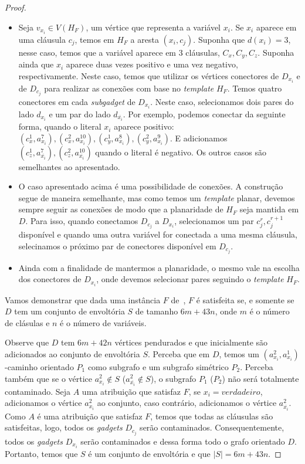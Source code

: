 \begin{theorem}
\begin{proof}
    \begin{itemize}
        \item Seja $v_{x_i} \in V(H_F)$, um vértice que representa a variável $x_i$. Se $x_i$ aparece em uma cláusula $c_j$, temos em $H_F$ a aresta $(x_i, c_j)$. Suponha que $d(x_i) = 3$, nesse caso, temos que a variável aparece em 3 cláusulas, $C_x, C_y, C_z$. Suponha ainda que $x_i$ aparece duas vezes positivo e uma vez negativo, respectivamente. Neste caso, temos que utilizar os vértices conectores de $D_{x_i}$ e de $D_{c_j}$ para realizar as conexões com base no \emph{template} $H_F$. Temos quatro conectores em cada \emph{subgadget} de $D_{x_i}$. Neste caso, selecionamos dois pares do lado $d_{x_i}$ e um par do lado $d_{\overline{x_i}}$. Por exemplo, podemos conectar da seguinte forma, quando o literal $x_i$ aparece positivo: $(c_x^1, a_{x_i}^7), (c_x^2, a_{x_i}^{10}), (c_y^1, a_{x_i}^8), (c_y^2, a_{x_i}^9)$. E adicionamos $(c_z^1, a_{\overline{x_i}}^7), (c_z^2, a_{\overline{x_i}}^{10})$ quando o literal é negativo. Os outros casos são semelhantes ao apresentado.
        \item O caso apresentado acima é uma possibilidade de conexões. A construção segue de maneira semelhante, mas como temos um \emph{template} planar, devemos sempre seguir as conexões de modo que a planaridade de $H_F$ seja mantida em $D$. Para isso, quando conectamos $D_{c_j}$ a $D_{x_i}$, selecionamos um par $c_j^r, c_j^{r+1}$ disponível e quando uma outra variável for conectada a uma mesma cláusula, selecinamos o próximo par de conectores disponível em $D_{c_j}$.
        \item Ainda com a finalidade de mantermos a planaridade, o mesmo vale na escolha dos conectores de $D_{x_i}$, onde devemos selecionar pares seguindo o \emph{template} $H_F$.
    \end{itemize}

    Vamos demonstrar que dada uma instância $F$ de~\sam, $F$ é satisfeita se, e somente se $D$ tem um conjunto de envoltória $S$ de tamanho $6m + 43n$, onde $m$ é o número de clásulas e $n$ é o número de variáveis.

    Observe que $D$ tem $6m + 42n$ vértices pendurados e que inicialmente são adicionados ao conjunto de envoltória $S$. Perceba que em $D$, temos um $(a_{x_i}^2, a_{x_i}^1)$-caminho orientado $P_1$ como subgrafo e um subgrafo simétrico $P_2$. Perceba também que se o vértice $a_{x_i}^2 \notin S$ ($a_{\overline{x_i}}^2 \notin S$), o subgrafo $P_1$ ($P_2$) não será totalmente contaminado. Seja $A$ uma atribuição que satisfaz $F$, se $x_i = verdadeiro$, adicionamos o vértice $a_{x_i}^2$ ao conjunto, caso contrário, adicionamos o vértice $a_{\overline{x_i}}^2$.  Como $A$ é uma atribuição que satisfaz $F$, temos que todas as cláusulas são satisfeitas, logo, todos os \emph{gadgets} $D_{c_j}$ serão contaminados. Consequentemente, todos os \emph{gadgets} $D_{x_i}$ serão contaminados e dessa forma todo o grafo orientado $D$. Portanto, temos que $S$ é um conjunto de envoltória e que $|S| = 6m + 43n$.


\end{proof}
\end{theorem}
